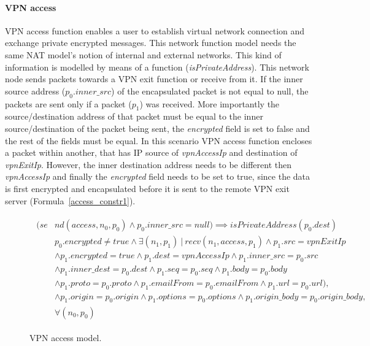 \paragraph{VPN access}
VPN access function enables a user to establish virtual network connection and exchange private encrypted messages. This network function model needs the same NAT model's  notion of internal and external networks. This kind of information is modelled by means of a function (\textit{isPrivateAddress}). This network node sends packets towards a VPN exit function or receive from it. If the inner source address ($p_{0}.inner\_src$) of the encapsulated packet is not equal to null, the packets are sent only if a packet ($p_1$) was received. More importantly the source/destination address of that packet must be equal to the inner source/destination of the packet being sent, the \textit{encrypted} field is set to false and the rest of the fields must be equal. In this scenario VPN access function encloses a packet within another, that has IP source of \textit{vpnAccessIp} and destination of \textit{vpnExitIp}. However, the inner destination address needs to be different then \textit{vpnAccessIp} and finally the \textit{encrypted} field needs to be set to true, since the data is first encrypted and encapsulated before it is sent to the remote VPN exit server (Formula~\ref{access_constr1}). 


\begin{figure}[]
	{\footnotesize
		\begin{subequations}
			\begin{align}
			\begin{split}
			\label{access_constr1}
			(se& nd(access, n_{0}, p_{0}) \wedge p_{0}.inner\_src = null) \implies isPrivateAddress(p_{0}.dest) \\
			& p_{0}.encrypted \neq true \wedge \exists (n_{1}, p_{1}) \: | \: recv(n_{1}, access, p_{1}) \wedge p_{1}.src = vpnExitIp \\
			& \wedge p_{1}.encrypted = true \wedge p_{1}.dest = vpnAccessIp \wedge p_{1}.inner\_src = p_{0}.src \\
			& \wedge p_{1}.inner\_dest = p_{0}.dest \wedge p_{1}.seq = p_{0}.seq \wedge p_{1}.body = p_{0}.body \\
			& \wedge p_{1}.proto = p_{0}.proto \wedge p_{1}.emailFrom = p_{0}.emailFrom \wedge p_{1}.url = p_{0}.url), \\
			& \wedge p_{1}.origin = p_{0}.origin   \wedge p_{1}.options = p_{0}.options \wedge p_{1}.origin\_body = p_{0}.origin\_body , \\
			& \forall (n_{0}, p_{0})
			\end{split}
			\end{align}
		\end{subequations}
	}%
	\caption{VPN access model.}
	\label{nat_model}
\end{figure}

